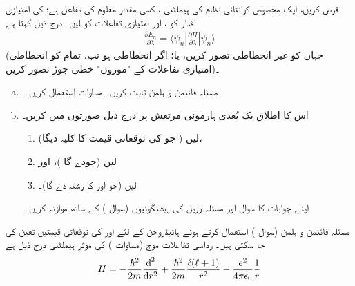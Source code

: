 فرض کریں،  ایک مخصوص کوانٹائی نظام کی  ہیملٹنی  ،  کسی مقدار معلوم     کی  تفاعل ہے؛ کی  امتیازی اقدار کو ،   اور امتیازی تفاعلات کو   لیں۔      درج ذیل کہتا ہے
\begin{align}\label{مساوات_غیر_مضطرب_مسئلہ_فائنمن}
\frac{\partial E_{n}}{\partial \lambda}=\big\langle{\psi_{n}|\frac{\partial{H}}{\partial{\lambda}}|\psi_{n}}\big\rangle
\end{align}
(جہاں   کو غیر انحطاطی تصور کریں،  یا؛ اگر انحطاطی ہو تب،  تمام کو انحطاطی امتیازی تفاعلات کے "موزوں" خطی جوڑ تصور کریں)۔
\begin{enumerate}[a.]
\item
   مسئلہ فائنمن و ہلمن    ثابت کریں۔   مساوات  استعمال کریں ۔ 
\item
  اس کا اطلاق یک بُعدی  ہارمونی  مرتعش   پر  درج ذیل   صورتوں میں کریں۔
\begin{enumerate}[1.]  
\item
  لیں ( جو  کی توقعاتی قیمت کا کلیہ دیگا)، 
  \item
  لیں (جودے گا )، اور
  \item
  لیں (جو اور کا  رشتہ دے گا)۔
 \end{enumerate}
    اپنے جوابات کا سوال اور مسئلہ  وریل   کی پیشنگوئیوں  (سوال )   کے ساتھ موازنہ  کریں ۔
 \end{enumerate}
مسئلہ فائنمن و ہلمن (سوال )  استعمال کرتے ہوئے ہائیڈروجن کے  لئے   اور   کی توقعاتی قیمتیں تعین  کی جا سکتی ہیں۔  رداسی تفاعلات موج    (مساوات ) کی  موثر  ہیملٹنی  درج ذیل ہے 
\begin{align*}
H=-\frac{\hslash^{2}}{2m}\frac{\dif^{\,2}}{\dif r^{2}}+\frac{\hslash^{2}}{2m}\frac{\ell (\ell +1)}{r^{2}}-\frac{e^{2}}{4\pi\epsilon_0}\frac{1}{r}
\end{align*}
